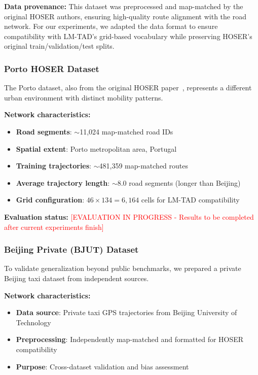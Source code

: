 \textbf{Data provenance:} This dataset was preprocessed and map-matched by the original HOSER authors, ensuring high-quality route alignment with the road network. For our experiments, we adapted the data format to ensure compatibility with LM-TAD's grid-based vocabulary while preserving HOSER's original train/validation/test splits.

\subsubsection{Porto HOSER Dataset}

The Porto dataset, also from the original HOSER paper~\cite{yangHOSERHigherorderStructureaware2023}, represents a different urban environment with distinct mobility patterns.

\textbf{Network characteristics:}
\begin{itemize}[noitemsep,topsep=0pt]
\item \textbf{Road segments}: $\sim$11,024 map-matched road IDs
\item \textbf{Spatial extent}: Porto metropolitan area, Portugal
\item \textbf{Training trajectories}: $\sim$481,359 map-matched routes
\item \textbf{Average trajectory length}: $\sim$8.0 road segments (longer than Beijing)
\item \textbf{Grid configuration}: $46 \times 134 = 6{,}164$ cells for LM-TAD compatibility
\end{itemize}

\textbf{Evaluation status:} \textcolor{red}{[EVALUATION IN PROGRESS - Results to be completed after current experiments finish]}

\subsubsection{Beijing Private (BJUT) Dataset}

To validate generalization beyond public benchmarks, we prepared a private Beijing taxi dataset from independent sources.

\textbf{Network characteristics:}
\begin{itemize}[noitemsep,topsep=0pt]
\item \textbf{Data source}: Private taxi GPS trajectories from Beijing University of Technology
\item \textbf{Preprocessing}: Independently map-matched and formatted for HOSER compatibility
\item \textbf{Purpose}: Cross-dataset validation and bias assessment
\end{itemize}

